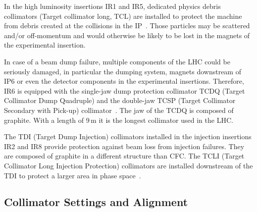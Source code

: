 In the high luminosity insertions IR1 and IR5, dedicated physics debris collimators (Target collimator long, TCL) are installed to protect the machine from debris created at the collisions in the IP~\cite{assmann:chamonixXIV}. Those particles may be scattered and/or off-momentum and would otherwise be likely to be lost in the magnets of the experimental insertion.

In case of a beam dump failure, multiple components of the LHC could be seriously damaged, in particular the dumping system, magnets downstream of IP6 or even the detector components in the experimental insertions. Therefore, IR6 is equipped with the single-jaw dump protection collimator TCDQ (Target Collimator Dump Quadruple) and the double-jaw TCSP (Target Collimator Secondary with Pick-up) collimator~\cite{assmann:chamonixXIV}. The jaw of the TCDQ is composed of graphite. With a length of 9\,m it is the longest collimator used in the LHC. 
 
The TDI (Target Dump Injection) collimators installed in the injection insertions IR2 and IR8 provide protection  against beam loss from injection failures. They are composed of graphite in a different structure than CFC. The TCLI (Target Collimator Long Injection Protection) collimators are installed downstream of the TDI to protect a larger area in phase space~\citedr. 






\subsection{Collimator Settings and Alignment}

